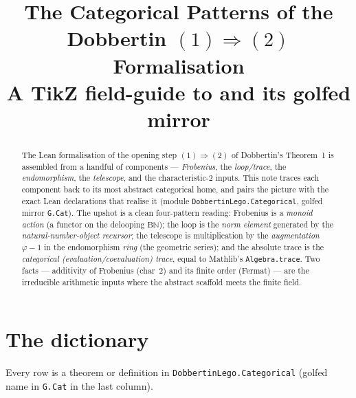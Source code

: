\documentclass[11pt]{article}
\title{\bfseries The Categorical Patterns of the\\
  Dobbertin $(1)\!\Rightarrow\!(2)$ Formalisation\\[4pt]
  \large A TikZ field-guide to \lc{DobbertinLego/Categorical.lean} and its
  golfed mirror \lc{G/Cat.lean}}
\author{}
\date{}
\newcommand{\lc}[1]{\texttt{\small #1}}
\newcommand{\Nn}{\mathbb{N}}
\newcommand{\B}{\mathrm{B}}
\begin{document}
\maketitle

\begin{abstract}
The Lean formalisation of the opening step $(1)\Rightarrow(2)$ of Dobbertin's
Theorem~1 is assembled from a handful of components --- \emph{Frobenius}, the
\emph{loop/trace}, the \emph{endomorphism}, the \emph{telescope}, and the
characteristic-$2$ inputs.  This note traces each component back to its most
abstract categorical home, and pairs the picture with the exact Lean
declarations that realise it (module \lc{DobbertinLego.Categorical}, golfed
mirror \lc{G.Cat}).  The upshot is a clean four-pattern reading: Frobenius is a
\emph{monoid action} (a functor on the delooping $\B\Nn$); the loop is the
\emph{norm element} generated by the \emph{natural-number-object recursor}; the
telescope is multiplication by the \emph{augmentation} $\varphi-1$ in the
endomorphism \emph{ring} (the geometric series); and the absolute trace is the
\emph{categorical (evaluation/coevaluation) trace}, equal to Mathlib's
\lc{Algebra.trace}.  Two facts --- additivity of Frobenius (char~$2$) and its
finite order (Fermat) --- are the irreducible arithmetic inputs where the
abstract scaffold meets the finite field.
\end{abstract}

\section{The dictionary}

Every row is a theorem or definition in \lc{DobbertinLego.Categorical}
(golfed name in \lc{G.Cat} in the last column).
\end{document}
